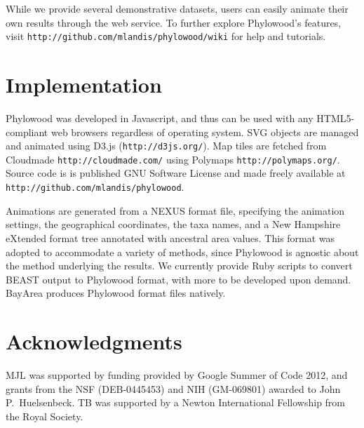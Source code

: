 \documentclass[11pt]{article}
\begin{document}
While we provide several demonstrative datasets, users can easily animate their own results through the web service. To further explore Phylowood's features, visit \texttt{http://github.com/mlandis/phylowood/wiki} for help and tutorials.

\section{Implementation}

Phylowood was developed in Javascript, and thus can be used with any HTML5-compliant web browsers regardless of operating system. SVG objects are managed and animated using D3.js (\texttt{http://d3js.org/}). Map tiles are fetched from Cloudmade \texttt{http://cloudmade.com/} using Polymaps \texttt{http://polymaps.org/}. Source code is is published GNU Software License and made freely available at \texttt{http://github.com/mlandis/phylowood}.

Animations are generated from a NEXUS format file, specifying the animation settings, the geographical coordinates, the taxa names, and a New Hampshire eXtended format tree annotated with ancestral area values. This format was adopted to accommodate a variety of methods, since Phylowood is agnostic about the method underlying the results. We currently provide Ruby scripts to convert BEAST output to Phylowood format, with more to be developed upon demand. BayArea produces Phylowood format files natively.

\section*{Acknowledgments}

MJL was supported by funding provided by Google Summer of Code 2012, and grants from the NSF (DEB-0445453) and NIH (GM-069801) awarded to John P.\ Huelsenbeck.  TB was supported by a Newton International Fellowship from the Royal Society.  



\newpage

\newpage
\end{document}
